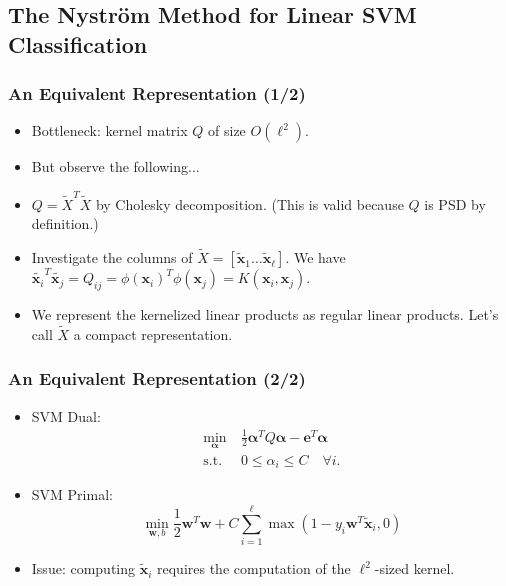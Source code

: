 \documentclass{beamer}
\def\bw{{\boldsymbol w}}
\def\balpha{{\boldsymbol \alpha}}
\def\be{{\boldsymbol e}}
\def\bx{{\boldsymbol x}}
\def\x{{\mathbf x}}
\begin{document}
\subsection{The Nystr\"om Method for Linear SVM Classification}
\begin{frame}
  \frametitle{An Equivalent Representation (1/2)}
  \begin{itemize}
    \item Bottleneck: kernel matrix $Q$ of size $O(\ell^2)$.
    \item [] But observe the following...
    \pause
    \item $Q = \tilde{X}^T\tilde{X}$ by Cholesky decomposition. (This is valid because $Q$ is PSD by definition.)
    \item Investigate the columns of $\tilde{X} = [\tilde{\bx}_1 \dots \tilde{\bx}_\ell]$. We have 
    $
    \tilde{\bx_i}^T \tilde{\bx_j} = 
    Q_{ij} = 
    \phi(\bx_i)^T \phi(\x_j) = K(\bx_i,\bx_j) 
    $.
    \pause
    \item We represent the kernelized linear products as regular linear products. Let's call $\tilde{X}$ a compact representation. 
  \end{itemize}
\end{frame}

\begin{frame}
  \frametitle{An Equivalent Representation (2/2)}
  \begin{itemize}
    \item SVM Dual: 
    \begin{align}
    \min_{\balpha} \  &  \frac{1}{2} \balpha^T Q  \balpha - \be^T \balpha \nonumber \\
    \mbox{s.t.} \  & 0 \le \alpha_i \le C \quad \forall i \mbox{.} \nonumber
    \end{align}
    \pause
    \item SVM Primal:
    \begin{equation}
      \min_{\bw, b}
      \frac{1}{2} \bw^T\bw + C\sum_{i=1}^\ell \max(1-y_i\bw^T\tilde{\bx}_i, 0) \nonumber
    \end{equation} 
    \pause
    \item Issue: computing $\tilde{\bx}_i$ requires the computation of the $\ell^2$-sized kernel.
  \end{itemize}
\end{frame}
\end{document}

